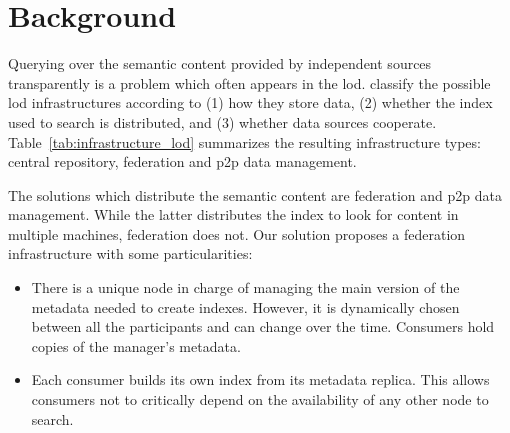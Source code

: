\section{Background}
\label{background}

Querying over the semantic content provided by independent sources transparently is a problem which often appears in the \acf{lod}.
\citet{gorlitz_federated_2011} classify the possible \ac{lod} infrastructures according to
(1) how they store data,
(2) whether the index used to search is distributed, and
(3) whether data sources cooperate.
Table~\ref{tab:infrastructure_lod} summarizes the resulting infrastructure types: central repository, federation and \ac{p2p} data management.





The solutions which distribute the semantic content are federation and \ac{p2p} data management.
While the latter distributes the index to look for content in multiple machines, federation does not.
Our solution proposes a federation infrastructure with some particularities:
\begin{itemize}
  \item There is a unique node in charge of managing the main version of the metadata needed to create indexes.
	However, it is dynamically chosen between all the participants and can change over the time.
	Consumers hold copies of the manager's metadata.
  \item Each consumer builds its own index from its metadata replica.
	This allows consumers not to critically depend on the availability of any other node to search. %
\end{itemize}


